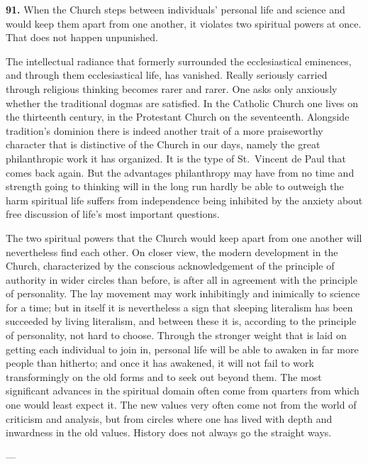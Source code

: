 \documentclass[12pt,a4paper]{book}
\newcommand{\opage}[1]{\marginnote{\footnotesize\textit{[#1]}}}
\begin{document}
\medskip

\noindent\textbf{91.} When the Church steps between individuals' personal life and science and would keep them
apart from one another, it violates two spiritual powers at once. That does not happen unpunished.

The intellectual radiance that formerly surrounded the ecclesiastical eminences, and through them ecclesiastical
life, has vanished. Really seriously carried through religious thinking becomes rarer and rarer. One asks only
anxiously whether the traditional dogmas 
\opage{208}are satisfied. In the Catholic Church one lives on the thirteenth
century, in the Protestant Church on the seventeenth. Alongside tradition's dominion there is indeed another trait
of a more praiseworthy character that is distinctive of the Church in our days, namely the great philanthropic work
it has organized. It is the type of St.~Vincent de Paul that comes back again. But the advantages philanthropy may
have from no time and strength going to thinking will in the long run hardly be able to outweigh the harm spiritual
life suffers from independence being inhibited by the anxiety about free discussion of life's most important
questions.

The two spiritual powers that the Church would keep apart from one another will nevertheless find each other. On
closer view, the modern development in the Church, characterized by the conscious acknowledgement of the principle
of authority in wider circles than before, is after all in agreement with the principle of personality. The lay
movement may work inhibitingly and inimically to science for a time; but in itself it is nevertheless a sign that
sleeping literalism has been succeeded by living literalism, and between these it is, according to the principle of
personality, not hard to choose. Through the stronger weight that is laid on getting each individual to join in,
personal life will be able to awaken in far more people than hitherto; and once it has awakened, it will not fail
to work transformingly on the old forms and to seek out beyond them. The most significant advances in the spiritual
domain often come from quarters from which one would least expect it. The new values very often come not from the
world of criticism and analysis, but from circles where one has lived with depth and inwardness in the old values.
History does not always go the straight ways.

\begin{center}---\end{center}
\end{document}
